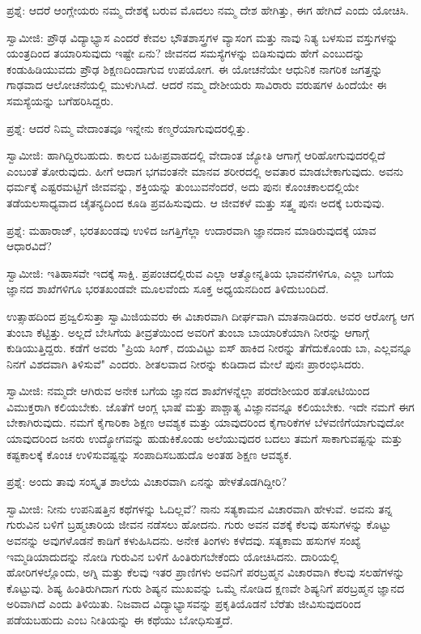 ಪ್ರಶ್ನೆ: ಆದರೆ ಆಂಗ್ಲೇಯರು ನಮ್ಮ ದೇಶಕ್ಕೆ ಬರುವ ಮೊದಲು ನಮ್ಮ ದೇಶ ಹೇಗಿತ್ತು, ಈಗ ಹೇಗಿದೆ ಎಂದು ಯೋಚಿಸಿ.

ಸ್ವಾಮೀಜಿ: ಪ್ರೌಢ ವಿದ್ಯಾಭ್ಯಾಸ ಎಂದರೆ ಕೇವಲ ಭೌತಶಾಸ್ತ್ರಗಳ ವ್ಯಾಸಂಗ ಮತ್ತು ನಾವು ನಿತ್ಯ ಬಳಸುವ ವಸ್ತುಗಳನ್ನು ಯಂತ್ರದಿಂದ ತಯಾರಿಸುವುದು ಇಷ್ಟೇ ಏನು? ಜೀವನದ ಸಮಸ್ಯೆಗಳನ್ನು ಬಿಡಿಸುವುದು ಹೇಗೆ ಎಂಬುದನ್ನು ಕಂಡುಹಿಡಿಯುವದು ಪ್ರೌಢ ಶಿಕ್ಷಣದಿಂದಾಗುವ ಉಪಯೋಗ. ಈ ಯೋಚನೆಯೇ ಆಧುನಿಕ ನಾಗರಿಕ ಜಗತ್ತನ್ನು ಗಾಢವಾದ ಆಲೋಚನೆಯಲ್ಲಿ ಮುಳುಗಿಸಿದೆ. ಆದರೆ ನಮ್ಮ ದೇಶೀಯರು ಸಾವಿರಾರು ವರುಷಗಳ ಹಿಂದೆಯೇ ಈ ಸಮಸ್ಯೆಯನ್ನು ಬಗೆಹರಿಸಿದ್ದರು.

ಪ್ರಶ್ನೆ: ಆದರೆ ನಿಮ್ಮ ವೇದಾಂತವೂ ಇನ್ನೇನು ಕಣ್ಮರೆಯಾಗುವುದರಲ್ಲಿತ್ತು.

ಸ್ವಾಮೀಜಿ: ಹಾಗಿದ್ದಿರಬಹುದು. ಕಾಲದ ಬಹಿಃಪ್ರವಾಹದಲ್ಲಿ ವೇದಾಂತ ಜ್ಯೋತಿ ಆಗಾಗ್ಗೆ ಆರಿಹೋಗುವುದರಲ್ಲಿದೆ ಎಂಬಂತೆ ತೋರುವುದು. ಹೀಗೆ ಆದಾಗ ಭಗವಂತನೇ ಮಾನವ ಶರೀರದಲ್ಲಿ ಅವತಾರ ಮಾಡಬೇಕಾಗುವುದು. ಅವನು ಧರ್ಮಕ್ಕೆ ಎಷ್ಟರಮಟ್ಟಿಗೆ ಜೀವವನ್ನು, ಶಕ್ತಿಯನ್ನು ತುಂಬುವನೆಂದರೆ, ಅದು ಪುನಃ ಕೊಂಚಕಾಲದಲ್ಲಿಯೇ ತಡೆಯಲಸಾಧ್ಯವಾದ ಚೈತನ್ಯದಿಂದ ಕೂಡಿ ಪ್ರವಹಿಸುವುದು. ಆ ಜೀವಕಳೆ ಮತ್ತು ಸತ್ತ್ವ ಪುನಃ ಅದಕ್ಕೆ ಬರುವುವು.

ಪ್ರಶ್ನೆ: ಮಹಾರಾಜ್, ಭರತಖಂಡವು ಉಳಿದ ಜಗತ್ತಿಗೆಲ್ಲಾ ಉದಾರವಾಗಿ ಜ್ಞಾನದಾನ ಮಾಡಿರುವುದಕ್ಕೆ ಯಾವ ಆಧಾರವಿದೆ?

ಸ್ವಾಮೀಜಿ: ಇತಿಹಾಸವೇ ಇದಕ್ಕೆ ಸಾಕ್ಷಿ. ಪ್ರಪಂಚದಲ್ಲಿರುವ ಎಲ್ಲಾ ಆತ್ಮೋನ್ನತಿಯ ಭಾವನೆಗಳಿಗೂ, ಎಲ್ಲಾ ಬಗೆಯ ಜ್ಞಾನದ ಶಾಖೆಗಳಿಗೂ ಭರತಖಂಡವೇ ಮೂಲವೆಂದು ಸೂಕ್ತ ಅಧ್ಯಯನದಿಂದ ತಿಳಿದುಬಂದಿದೆ.

ಉತ್ಸಾಹದಿಂದ ಪ್ರಜ್ವಲಿಸುತ್ತಾ ಸ್ವಾಮಿಜಿಯವರು ಈ ವಿಚಾರವಾಗಿ ದೀರ್ಘವಾಗಿ ಮಾತನಾಡಿದರು. ಅವರ ಆರೋಗ್ಯ ಆಗ ತುಂಬಾ ಕೆಟ್ಟಿತ್ತು. ಅಲ್ಲದೆ ಬೇಸಿಗೆಯ ತೀವ್ರತೆಯಿಂದ ಅವರಿಗೆ ತುಂಬಾ ಬಾಯಾರಿಕೆಯಾಗಿ ನೀರನ್ನು ಆಗಾಗ್ಗೆ ಕುಡಿಯುತ್ತಿದ್ದರು. ಕಡೆಗೆ ಅವರು "ಪ್ರಿಯ ಸಿಂಗ್, ದಯವಿಟ್ಟು ಐಸ್ ಹಾಕಿದ ನೀರನ್ನು ತೆಗೆದುಕೊಂಡು ಬಾ, ಎಲ್ಲವನ್ನೂ ನಿನಗೆ ವಿಶದವಾಗಿ ತಿಳಿಸುವೆ" ಎಂದರು. ಶೀತಲವಾದ ನೀರನ್ನು ಕುಡಿದಾದ ಮೇಲೆ ಪುನಃ ಪ್ರಾರಂಭಿಸಿದರು.

ಸ್ವಾಮೀಜಿ: ನಮ್ಮದೇ ಆಗಿರುವ ಅನೇಕ ಬಗೆಯ ಜ್ಞಾನದ ಶಾಖೆಗಳನ್ನೆಲ್ಲಾ ಪರದೇಶೀಯರ ಹತೋಟಿಯಿಂದ ವಿಮುಕ್ತರಾಗಿ ಕಲಿಯಬೇಕು. ಜೊತೆಗೆ ಆಂಗ್ಲ ಭಾಷೆ ಮತ್ತು ಪಾಶ್ಚಾತ್ಯ ವಿಜ್ಞಾನವನ್ನೂ ಕಲಿಯಬೇಕು. ಇದೇ ನಮಗೆ ಈಗ ಬೇಕಾಗಿರುವುದು. ನಮಗೆ ಕೈಗಾರಿಕಾ ಶಿಕ್ಷಣ ಆವಶ್ಯಕ ಮತ್ತು ಯಾವುದರಿಂದ ಕೈಗಾರಿಕೆಗಳ ಬೆಳವಣಿಗೆಯಾಗುವುದೋ ಯಾವುದರಿಂದ ಜನರು ಉದ್ಯೋಗವನ್ನು ಹುಡುಕಿಕೊಂಡು ಅಲೆಯುವುದರ ಬದಲು ತಮಗೆ ಸಾಕಾಗುವಷ್ಟನ್ನು ಮತ್ತು ಕಷ್ಟಕಾಲಕ್ಕೆ ಕೊಂಚ ಉಳಿಸುವಷ್ಟನ್ನು ಸಂಪಾದಿಸಬಹುದೊ ಅಂತಹ ಶಿಕ್ಷಣ ಆವಶ್ಯಕ.

ಪ್ರಶ್ನೆ: ಅಂದು ತಾವು ಸಂಸ್ಕೃತ ಶಾಲೆಯ ವಿಚಾರವಾಗಿ ಏನನ್ನು ಹೇಳತೊಡಗಿದ್ದೀರಿ?

ಸ್ವಾಮೀಜಿ: ನೀನು ಉಪನಿಷತ್ತಿನ ಕಥೆಗಳನ್ನು ಓದಿಲ್ಲವೆ? ನಾನು ಸತ್ಯಕಾಮನ ವಿಚಾರವಾಗಿ ಹೇಳುವೆ. ಅವನು ತನ್ನ ಗುರುವಿನ ಬಳಿಗೆ ಬ್ರಹ್ಮಚಾರಿಯ ಜೀವನ ನಡೆಸಲು ಹೋದನು. ಗುರು ಅವನ ವಶಕ್ಕೆ ಕೆಲವು ಹಸುಗಳನ್ನು ಕೊಟ್ಟು ಅವನನ್ನು ಅವುಗಳೊಡನೆ ಕಾಡಿಗೆ ಕಳುಹಿಸಿದನು. ಅನೇಕ ತಿಂಗಳು ಕಳೆದವು. ಸತ್ಯಕಾಮ ಹಸುಗಳ ಸಂಖ್ಯೆ ಇಮ್ಮಡಿಯಾದುದನ್ನು ನೋಡಿ ಗುರುವಿನ ಬಳಿಗೆ ಹಿಂತಿರುಗಬೇಕೆಂದು ಯೋಚಿಸಿದನು. ದಾರಿಯಲ್ಲಿ ಹೋರಿಗಳಲ್ಲೊಂದು, ಅಗ್ನಿ ಮತ್ತು ಕೆಲವು ಇತರ ಪ್ರಾಣಿಗಳು ಅವನಿಗೆ ಪರಬ್ರಹ್ಮನ ವಿಚಾರವಾಗಿ ಕೆಲವು ಸಲಹೆಗಳನ್ನು ಕೊಟ್ಟುವು. ಶಿಷ್ಯ ಹಿಂತಿರುಗಿದಾಗ ಗುರು ಶಿಷ್ಯನ ಮುಖವನ್ನು ಒಮ್ಮೆ ನೋಡಿದ ಕ್ಷಣವೇ ಶಿಷ್ಯನಿಗೆ ಪರಬ್ರಹ್ಮನ ಜ್ಞಾನದ ಅರಿವಾಗಿದೆ ಎಂದು ತಿಳಿಯಿತು. ನಿಜವಾದ ವಿದ್ಯಾಭ್ಯಾಸವನ್ನು ಪ್ರಕೃತಿಯೊಡನೆ ಬೆರೆತು ಜೀವಿಸುವುದರಿಂದ ಪಡೆಯಬಹುದು ಎಂಬ ನೀತಿಯನ್ನು ಈ ಕಥೆಯು ಬೋಧಿಸುತ್ತದೆ.

